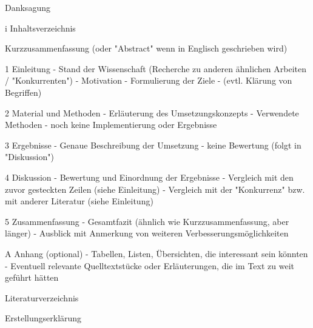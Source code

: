 Danksagung

i  Inhaltsverzeichnis

Kurzzusammenfassung (oder "Abstract" wenn in Englisch geschrieben wird)

1  Einleitung
- Stand der Wissenschaft
  (Recherche zu anderen ähnlichen Arbeiten / "Konkurrenten")
- Motivation
- Formulierung der Ziele
- (evtl. Klärung von Begriffen)

2  Material und Methoden
- Erläuterung des Umsetzungskonzepts
- Verwendete Methoden
- noch keine Implementierung oder Ergebnisse

3  Ergebnisse
- Genaue Beschreibung der Umsetzung
- keine Bewertung (folgt in "Diskussion")

4  Diskussion
- Bewertung und Einordnung der Ergebnisse
- Vergleich mit den zuvor gesteckten Zeilen (siehe Einleitung)
- Vergleich mit der "Konkurrenz" bzw. mit anderer Literatur (siehe Einleitung)

5  Zusammenfassung
- Gesamtfazit (ähnlich wie Kurzzusammenfassung, aber länger)
- Ausblick mit Anmerkung von weiteren Verbesserungsmöglichkeiten

A  Anhang (optional)
- Tabellen, Listen, Übersichten, die interessant sein könnten
- Eventuell relevante Quelltextstücke oder
  Erläuterungen, die im Text zu weit geführt hätten

Literaturverzeichnis

Erstellungserklärung


